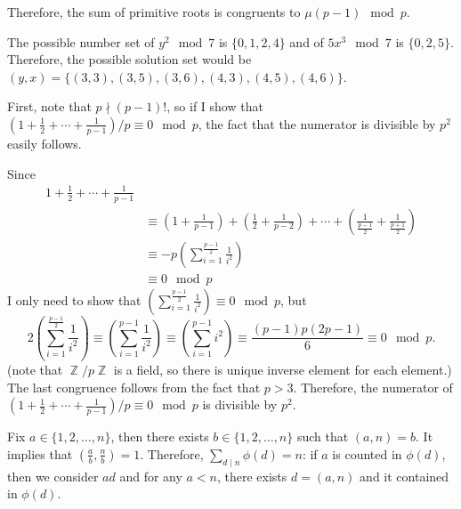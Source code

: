 \documentclass[12pt]{article}
\newenvironment{problem}[2][Problem]{\begin{trivlist}
\item[\hskip \labelsep {\bfseries #1}\hskip \labelsep {\bfseries #2.}]}{\end{trivlist}}
\DeclareMathOperator{\zz}{\mathbb{Z}}
\begin{document}
Therefore, the sum of primitive roots is congruents to $\mu(p-1)\mod p$.
\begin{problem}{2}
\end{problem}
The possible number set of $y^2\mod 7$ is $\{0,1,2,4\}$ and of $5x^3\mod 7$ is $\{0,2,5\}$. Therefore, the possible solution set would be $(y,x)=\{(3,3),(3,5),(3,6),(4,3),(4,5),(4,6)\}$.
\begin{problem}{3}
\end{problem}
First, note that $p\nmid (p-1)!$, so if I show that $\left(1+\frac{1}{2}+\cdots+\frac{1}{p-1}\right)/p\equiv 0\mod p$, the fact that the numerator is divisible by $p^2$ easily follows.

Since
\begin{equation*}
    \begin{split}
    1+\frac{1}{2}+\cdots+\frac{1}{p-1} \\
    &\equiv \left(1+\frac{1}{p-1}\right) + \left(\frac{1}{2}+\frac{1}{p-2}\right) + \cdots + \left(\frac{1}{\frac{p-1}{2}}+\frac{1}{\frac{p+1}{2}}\right) \\
    &\equiv -p\left(\sum\limits_{i=1}^{\frac{p-1}{2}} \frac{1}{i^2}\right)\\
    &\equiv 0\mod p
    \end{split}
\end{equation*}
I only need to show that $\left(\sum\limits_{i=1}^{\frac{p-1}{2}} \frac{1}{i^2}\right)\equiv 0\mod p$, but
\begin{equation*}
    2\left(\sum\limits_{i=1}^{\frac{p-1}{2}} \frac{1}{i^2}\right)\equiv \left(\sum\limits_{i=1}^{p-1} \frac{1}{i^2}\right)\equiv \left(\sum\limits_{i=1}^{p-1} i^2\right)\equiv \frac{(p-1)p(2p-1)}{6}\equiv 0\mod p.
\end{equation*}
(note that $\zz/p\zz$ is a field, so there is unique inverse element for each element.) The last congruence follows from the fact that $p>3$. Therefore, the numerator of $\left(1+\frac{1}{2}+\cdots+\frac{1}{p-1}\right)/p\equiv 0\mod p$ is divisible by $p^2$.
\begin{problem}{4}
\end{problem}
Fix $a\in \{1, 2,\ldots, n\}$, then there exists $b\in \{1, 2,\ldots, n\}$ such that $(a,n)=b$. It implies that $\left(\frac{a}{b}, \frac{n}{b}\right)=1$. Therefore, $\sum\limits_{d\mid n}\phi(d)= n$: if $a$ is counted in $\phi(d)$, then we consider $ad$ and for any $a<n$, there exists $d=(a,n)$ and it contained in $\phi(d)$.
\end{document}
